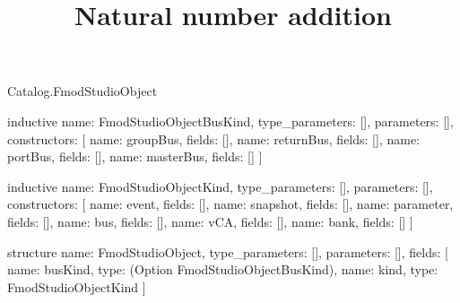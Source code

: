 \begin{lexlean}{Catalog.FmodStudioObject}
\title{Natural number addition}
\begin{semanticmodule}
inductive{
  name: FmodStudioObjectBusKind,
  type_parameters: [],
  parameters: [],
  constructors: [
    {name: groupBus, fields: []},
    {name: returnBus, fields: []},
    {name: portBus, fields: []},
    {name: masterBus, fields: []}
  ]
}

inductive{
  name: FmodStudioObjectKind,
  type_parameters: [],
  parameters: [],
  constructors: [
    {name: event, fields: []},
    {name: snapshot, fields: []},
    {name: parameter, fields: []},
    {name: bus, fields: []},
    {name: vCA, fields: []},
    {name: bank, fields: []}
  ]
}

structure{
  name: FmodStudioObject,
  type_parameters: [],
  parameters: [],
  fields: [
    {name: busKind, type: (Option FmodStudioObjectBusKind)},
    {name: kind, type: FmodStudioObjectKind}
  ]
}
\end{semanticmodule}
\end{lexlean}
